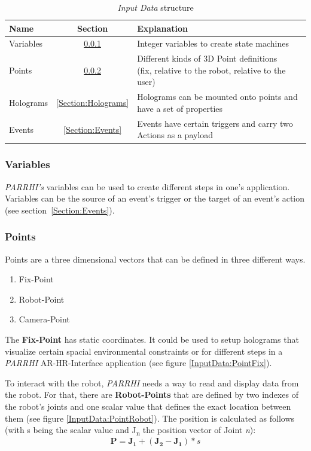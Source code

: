 \begin{table}[ht]
	\caption{\textit{Input Data} structure}
	\label{Table:InputDataStructure}
	\centering
	\begin{tabular}{lcl}
		\toprule
		Name & Section		& Explanation	\\		
		\midrule
		Variables & \ref{Section:Variables}		& Integer variables to create state machines \\
		Points& \ref{Section:Points}		& \parbox[t]{10cm}{Different kinds of 3D Point definitions\\(fix, relative to the robot, relative to the user)} 	 \\
		Holograms& \ref{Section:Holograms} & Holograms can be mounted onto points and have a set of properties\\
		Events& \ref{Section:Events} & Events have certain triggers and carry two Actions as a payload \\
		\bottomrule
	\end{tabular}
\end{table}

\subsubsection{Variables}\label{Section:Variables}
\textit{PARRHI's} variables can be used to create different steps in one's application. Variables can be the source of an event's trigger or the target of an event's action (see section~\ref{Section:Events}).

\subsubsection{Points}\label{Section:Points}
Points are a three dimensional vectors that can be defined in three different ways. 
\begin{enumerate}
	\setlength\itemsep{-1em}
	\item Fix-Point
	\item Robot-Point
	\item Camera-Point
\end{enumerate}

The \textbf{Fix-Point} has static coordinates. It could be used to setup holograms that visualize certain spacial environmental constraints or for different steps in a \textit{PARRHI} AR-HR-Interface application (see figure \ref{InputData:PointFix}).

To interact with the robot, \textit{PARRHI} needs a way to read and display data from the robot. For that, there are \textbf{Robot-Points} that are defined by two indexes of the robot's joints and one scalar value that defines the exact location between them (see figure \ref{InputData:PointRobot}). The position is calculated as follows (with s being the scalar value and J\textsubscript{n} the position vector of Joint \textit{n}):
\begin{equation}
\boldsymbol{P} = \boldsymbol{J_1} + (\boldsymbol{J_2}-\boldsymbol{J_1}) * s
\end{equation}

